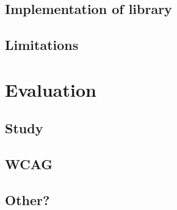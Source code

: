 \documentclass[ %
                    author={Aleena Baig},
                supervisor={Dr Simon Lock},
                    degree={BSc},
                     title={On Making Web Accessible Graphs},
                  subtitle={},
                      year={2019} ]{dissertation}
\begin{document}




\section{Implementation of library}


\section{Limitations}


\chapter{Evaluation}

\section{Study}

\section{WCAG}


\section{Other?}

\end{document}
